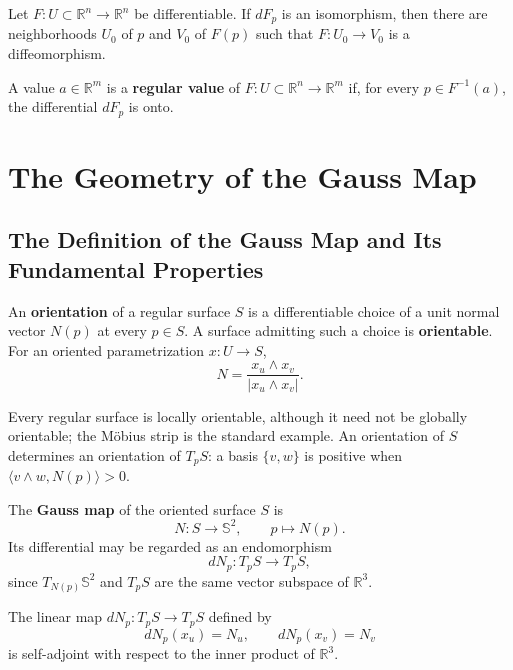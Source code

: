 \documentclass[12pt, oneside]{book}
\begin{document}
\begin{theorem}
    Let $F:U\subset \mathbb{R}^n\rightarrow \mathbb{R}^n$ be differentiable.
    If $dF_p$ is an isomorphism, then there are neighborhoods $U_0$ of $p$
    and $V_0$ of $F(p)$ such that
    $F:U_0\rightarrow V_0$ is a diffeomorphism.
\end{theorem}

\begin{definition}
    A value $a\in \mathbb{R}^m$ is a \textbf{regular value} of
    $F:U\subset \mathbb{R}^n\rightarrow \mathbb{R}^m$ if, for every
    $p\in F^{-1}(a)$, the differential $dF_p$ is onto.
\end{definition}

\chapter{The Geometry of the Gauss Map}
\section{The Definition of the Gauss Map and Its Fundamental Properties}

\begin{definition}
    An \textbf{orientation} of a regular surface $S$ is a differentiable choice
    of a unit normal vector $N(p)$ at every $p\in S$.  A surface admitting such
    a choice is \textbf{orientable}.  For an oriented parametrization
    $x:U\rightarrow S$,
    \[
        N=\frac{x_u\wedge x_v}{|x_u\wedge x_v|}.
    \]
\end{definition}

Every regular surface is locally orientable, although it need not be globally
orientable; the M\"obius strip is the standard example.  An orientation of
$S$ determines an orientation of $T_pS$: a basis $\{v,w\}$ is positive when
$\langle v\wedge w,N(p)\rangle>0$.

\begin{definition}
    The \textbf{Gauss map} of the oriented surface $S$ is
    \[
        N:S\longrightarrow\mathbb{S}^2,
        \qquad p\longmapsto N(p).
    \]
    Its differential may be regarded as an endomorphism
    \[
        dN_p:T_pS\longrightarrow T_pS,
    \]
    since $T_{N(p)}\mathbb{S}^2$ and $T_pS$ are the same vector subspace of
    $\mathbb{R}^3$.
\end{definition}




\begin{proposition}
    The linear map $dN_p:T_pS\rightarrow T_pS$ defined by
    \begin{equation*}
        dN_p(x_u)=N_u,\qquad dN_p(x_v)=N_v
    \end{equation*}
    is self-adjoint with respect to the inner product of $\mathbb{R}^3$.
\end{proposition}
\end{document}
